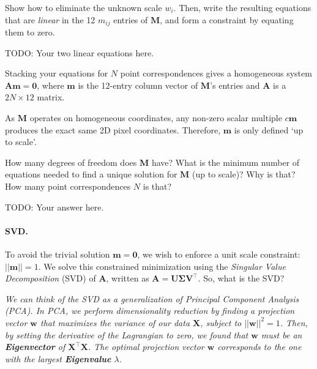 \documentclass{csci1430}
\begin{document}
\begin{subquestion}[points=2]
Show how to eliminate the unknown scale $w_i$. Then, write the resulting equations that are \emph{linear} in the 12 $m_{ij}$ entries of $\mathbf{M}$, and form a constraint by equating them to zero.
\end{subquestion}

\begin{answer}[height=18]
TODO: Your two linear equations here.
\end{answer}

\pagebreak


\begin{subquestion}[points=2,drawbox=false]
Stacking your equations for $N$ point correspondences gives a homogeneous system $\mathbf{A}\mathbf{m} = \mathbf{0}$, where $\mathbf{m}$ is the 12-entry column vector of $\mathbf{M}$'s entries and $\mathbf{A}$ is a $2N \times 12$ matrix.

As $\mathbf{M}$ operates on homogeneous coordinates, any non-zero scalar multiple $c\mathbf{m}$ produces the exact same 2D pixel coordinates. Therefore, $\mathbf{m}$ is only defined `up to scale'.

\begin{orangebox}
How many degrees of freedom does $\mathbf{M}$ have?
What is the minimum number of equations needed to find a unique solution for $\mathbf{M}$ (up to scale)?
Why is that?
How many point correspondences $N$ is that?
\end{orangebox}
\end{subquestion}

\begin{answer}[height=8]
TODO: Your answer here.
\end{answer}

\pagebreak

\paragraph{SVD.}
To avoid the trivial solution $\mathbf{m} = \mathbf{0}$, we wish to enforce a unit scale constraint: $||\mathbf{m}|| = 1$. We solve this constrained minimization using the \emph{Singular Value Decomposition} (SVD) of $\mathbf{A}$, written as $\mathbf{A} = \mathbf{U}\boldsymbol{\Sigma}\mathbf{V}^\top$. So, what is the SVD?

\textit{We can think of the SVD as a generalization of Principal Component Analysis (PCA). In PCA, we perform dimensionality reduction by finding a projection vector $\mathbf{w}$ that maximizes the variance of our data $\mathbf{X}$, subject to $||\mathbf{w}||^2=1$. Then, by setting the derivative of the Lagrangian to zero, we found that $\mathbf{w}$ must be an \textbf{Eigenvector} of $\mathbf{X}^\top\mathbf{X}$. The optimal projection vector $\mathbf{w}$ corresponds to the one with the largest \textbf{Eigenvalue} $\lambda$.}
\end{document}
